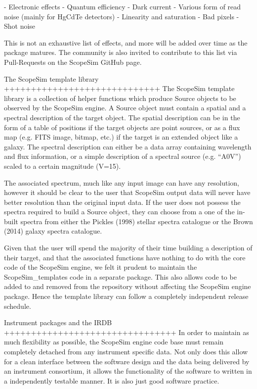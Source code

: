 - Electronic effects
    - Quantum efficiency
    - Dark current
    - Various form of read noise (mainly for HgCdTe detectors)
    - Linearity and saturation
    - Bad pixels
    - Shot noise

This is not an exhaustive list of effects, and more will be added over time as
the package matures. The community is also invited to contribute to this list
via Pull-Requests on the ScopeSim GitHub page.


The ScopeSim template library
+++++++++++++++++++++++++++++
The ScopeSim template library is a collection of helper functions which produce
Source objects to be observed by the ScopeSim engine. A Source object must
contain a spatial and a spectral description of the target object. The spatial
description can be in the form of a table of positions if the target objects are
point sources, or as a flux map (e.g. FITS image, bitmap, etc.) if the
target is an extended object like a galaxy. The spectral description can either
be a data array containing wavelength and flux information, or a simple
description of a spectral source (e.g. ``A0V'') scaled to a certain magnitude
(V=15).

The associated spectrum, much like any input image can have any resolution,
however it should be clear to the user that ScopeSim output data will never
have better resolution than the original input data. If the user does not
possess the spectra required to build a Source object, they can choose from a
one of the in-built spectra from either the Pickles (1998) stellar spectra
catalogue or the Brown (2014) galaxy spectra catalogue.

Given that the user will spend the majority of their time building a description
of their target, and that the associated functions have nothing to do with the
core code of the ScopeSim engine, we felt it prudent to maintain the
ScopeSim_templates code in a separate package. This also allows code to be added
to and removed from the repository without affecting the ScopeSim engine
package. Hence the template library can follow a completely independent release
schedule.


Instrument packages and the IRDB
++++++++++++++++++++++++++++++++
In order to maintain as much flexibility as possible, the ScopeSim engine
code base must remain completely detached from any instrument specific data.
Not only does this allow for a clean interface between the software design and
the data being delivered by an instrument consortium, it allows the
functionality of the software to written in a independently testable manner.
It is also just good software practice.

